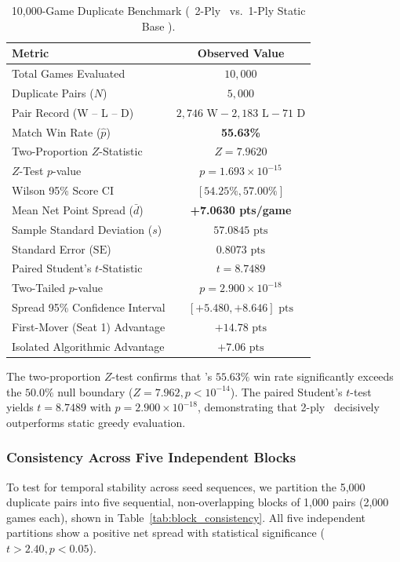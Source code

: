 \begin{table}[!htbp]
\centering
\small
\caption{10,000-Game Duplicate Benchmark (\algo\ 2-Ply \bams\ vs.\ 1-Ply Static Base \magpie).}
\label{tab:duplicate_10000}
\begin{tabular}{lc}
\toprule
\textbf{Metric} & \textbf{Observed Value} \\
\midrule
Total Games Evaluated & $10,000$ \\
Duplicate Pairs ($N$) & $5,000$ \\
Pair Record (W -- L -- D) & $2,746\text{ W} - 2,183\text{ L} - 71\text{ D}$ \\
Match Win Rate ($\hat{p}$) & \textbf{55.63\%} \\
Two-Proportion $Z$-Statistic & $Z = 7.9620$ \\
$Z$-Test $p$-value & $p = 1.693 \times 10^{-15}$ \\
Wilson 95\% Score CI & $[54.25\%, 57.00\%]$ \\
\midrule
Mean Net Point Spread ($\bar{d}$) & \textbf{+7.0630 pts/game} \\
Sample Standard Deviation ($s$) & $57.0845\text{ pts}$ \\
Standard Error ($\mathrm{SE}$) & $0.8073\text{ pts}$ \\
Paired Student's $t$-Statistic & $t = 8.7489$ \\
Two-Tailed $p$-value & \textbf{$p = 2.900 \times 10^{-18}$} \\
Spread 95\% Confidence Interval & $[+5.480, +8.646]\text{ pts}$ \\
\midrule
First-Mover (Seat 1) Advantage & $+14.78\text{ pts}$ \\
Isolated Algorithmic Advantage & $+7.06\text{ pts}$ \\
\bottomrule
\end{tabular}
\end{table}

The two-proportion $Z$-test confirms that \algo's $55.63\%$ win rate significantly exceeds the $50.0\%$ null boundary ($Z = 7.962, p < 10^{-14}$). The paired Student's $t$-test yields $t = 8.7489$ with $p = 2.900 \times 10^{-18}$, demonstrating that 2-ply \bams\ decisively outperforms static greedy evaluation.

\subsubsection{Consistency Across Five Independent Blocks}

To test for temporal stability across seed sequences, we partition the 5,000 duplicate pairs into five sequential, non-overlapping blocks of 1,000 pairs (2,000 games each), shown in Table~\ref{tab:block_consistency}. All five independent partitions show a positive net spread with statistical significance ($t > 2.40, p < 0.05$).

